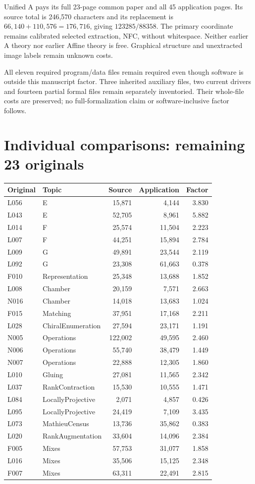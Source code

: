 \documentclass[11pt,a4paper]{article}
\begin{document}
Unified A pays its full 23-page common paper and all 45 application pages. Its source total is 246,570 characters and its replacement is $66,140+110,576=176,716$, giving $123285/88358$. The primary coordinate remains calibrated selected extraction, NFC, without whitespace. Neither earlier A theory nor earlier Affine theory is free. Graphical structure and unextracted image labels remain unknown costs.

All eleven required program/data files remain required even though software is outside this manuscript factor. Three inherited auxiliary files, two current drivers and fourteen partial formal files remain separately inventoried. Their whole-file costs are preserved; no full-formalization claim or software-inclusive factor follows.
\newpage
\section*{Individual comparisons: remaining 23 originals}
\begin{center}\small\begin{tabular}{llrrr}\toprule
Original & Topic & Source & Application & Factor\\\midrule
L056 & E & 15,871 & 4,144 & 3.830 \\
L043 & E & 52,705 & 8,961 & 5.882 \\
L014 & F & 25,574 & 11,504 & 2.223 \\
L007 & F & 44,251 & 15,894 & 2.784 \\
L009 & G & 49,891 & 23,544 & 2.119 \\
L092 & G & 23,308 & 61,663 & 0.378 \\
F010 & Representation & 25,348 & 13,688 & 1.852 \\
L008 & Chamber & 20,159 & 7,571 & 2.663 \\
N016 & Chamber & 14,018 & 13,683 & 1.024 \\
F015 & Matching & 37,951 & 17,168 & 2.211 \\
L028 & ChiralEnumeration & 27,594 & 23,171 & 1.191 \\
N005 & Operations & 122,002 & 49,595 & 2.460 \\
N006 & Operations & 55,740 & 38,479 & 1.449 \\
N007 & Operations & 22,888 & 12,305 & 1.860 \\
L010 & Gluing & 27,081 & 11,565 & 2.342 \\
L037 & RankContraction & 15,530 & 10,555 & 1.471 \\
L084 & LocallyProjective & 2,071 & 4,857 & 0.426 \\
L095 & LocallyProjective & 24,419 & 7,109 & 3.435 \\
L073 & MathieuCensus & 13,736 & 35,862 & 0.383 \\
L020 & RankAugmentation & 33,604 & 14,096 & 2.384 \\
F005 & Mixes & 57,753 & 31,077 & 1.858 \\
L016 & Mixes & 35,506 & 15,125 & 2.348 \\
F007 & Mixes & 63,311 & 22,491 & 2.815 \\\bottomrule\end{tabular}\end{center}
\end{document}
